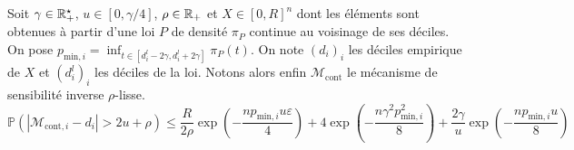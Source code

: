\begin{theorem}
    Soit \(\gamma \in \mathbb{R}_+^\star\), \(u \in [0, \gamma/4]\), \(\rho \in \mathbb{R}_+\) et \(X \in [0,R]^n\) dont les éléments sont obtenues à partir d'une loi \(P\) de densité \(\pi_P\) continue au voisinage de ses déciles. On pose \(p_{\text{min}, i} = \inf_{t \in [d_i^l - 2\gamma, d_i^l + 2\gamma]} \pi_P(t)\). On note \((d_i)_i\) les déciles empirique de \(X\) et \((d_i^l)_i\) les déciles de la loi. Notons alors enfin \(\mathcal M_{\text{cont}}\) le mécanisme de sensibilité inverse \(\rho\)-lisse.
    \[
        \mathbb P\left( |\mathcal M_{\text{cont}, i} - d_i| > 2u + \rho\right) \leq \dfrac{R}{2\rho}\exp\left(- \dfrac{np_{\text{min}, i}u\varepsilon}{4} \right) + 4\exp\left(- \dfrac{n\gamma^2p_{\text{min},i}^2}{8} \right) + \dfrac{2\gamma}{u}\exp\left( -\dfrac{np_{\text{min},i}u}{8} \right)
    \]
\end{theorem}

